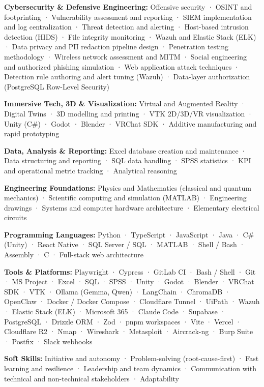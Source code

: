 \documentclass[10pt,a4paper]{article}
\newcommand{\cvskill}[2]{\par{\bfseries #1:} #2\par}
\newcommand{\cvmoreprojects}[1]{\needspace{2\baselineskip}\vspace{2pt}{\bfseries Also built:} #1\par}
\begin{document}
\cvskill{Cybersecurity \& Defensive Engineering}{Offensive security · OSINT and footprinting · Vulnerability assessment and reporting · SIEM implementation and log centralization · Threat detection and alerting · Host-based intrusion detection (HIDS) · File integrity monitoring · Wazuh and Elastic Stack (ELK) · Data privacy and PII redaction pipeline design · Penetration testing methodology · Wireless network assessment and MITM · Social engineering and authorized phishing simulation · Web application attack techniques · Detection rule authoring and alert tuning (Wazuh) · Data-layer authorization (PostgreSQL Row-Level Security)}
\cvskill{Immersive Tech, 3D \& Visualization}{Virtual and Augmented Reality · Digital Twins · 3D modelling and printing · VTK 2D/3D/VR visualization · Unity (C\#) · Godot · Blender · VRChat SDK · Additive manufacturing and rapid prototyping}
\cvskill{Data, Analysis \& Reporting}{Excel database creation and maintenance · Data structuring and reporting · SQL data handling · SPSS statistics · KPI and operational metric tracking · Analytical reasoning}
\cvskill{Engineering Foundations}{Physics and Mathematics (classical and quantum mechanics) · Scientific computing and simulation (MATLAB) · Engineering drawings · Systems and computer hardware architecture · Elementary electrical circuits}
\cvskill{Programming Languages}{Python · TypeScript · JavaScript · Java · C\# (Unity) · React Native · SQL Server / SQL · MATLAB · Shell / Bash · Assembly · C · Full-stack web architecture}
\cvskill{Tools \& Platforms}{Playwright · Cypress · GitLab CI · Bash / Shell · Git · MS Project · Excel · SQL · SPSS · Unity · Godot · Blender · VRChat SDK · VTK · Ollama (Gemma, Qwen) · LangChain · ChromaDB · OpenClaw · Docker / Docker Compose · Cloudflare Tunnel · UiPath · Wazuh · Elastic Stack (ELK) · Microsoft 365 · Claude Code · Supabase · PostgreSQL · Drizzle ORM · Zod · pnpm workspaces · Vite · Vercel · Cloudflare R2 · Nmap · Wireshark · Metasploit · Aircrack-ng · Burp Suite · Postfix · Slack webhooks}
\cvskill{Soft Skills}{Initiative and autonomy · Problem-solving (root-cause-first) · Fast learning and resilience · Leadership and team dynamics · Communication with technical and non-technical stakeholders · Adaptability}

\end{document}
